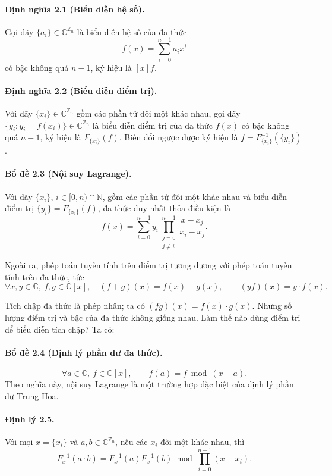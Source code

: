\documentclass[11pt]{article}
\begin{document}
\paragraph{Định nghĩa 2.1 (Biểu diễn hệ số).}
Gọi dãy \(\{a_i\}\in\mathbb C^{\mathbb Z_n}\) là biểu diễn hệ số của đa thức
\[
  f(x)=\sum_{i=0}^{n-1} a_i x^i
\]
có bậc không quá \(n-1\), ký hiệu là \([x]f\).

\paragraph{Định nghĩa 2.2 (Biểu diễn điểm trị).}
Với dãy \(\{x_i\}\in\mathbb C^{\mathbb Z_n}\) gồm các phần tử đôi một khác
nhau, gọi dãy \(\{y_i:y_i=f(x_i)\}\in\mathbb C^{\mathbb Z_n}\) là biểu diễn
điểm trị của đa thức \(f(x)\) có bậc không quá \(n-1\), ký hiệu là
\(F_{\{x_i\}}(f)\). Biến đổi ngược được ký hiệu là
\(f=F^{-1}_{\{x_i\}}(\{y_i\})\).

\paragraph{Bổ đề 2.3 (Nội suy Lagrange).}
Với dãy \(\{x_i\}\), \(i\in[0,n)\cap\mathbb N\), gồm các phần tử đôi một khác
nhau và biểu diễn điểm trị \(\{y_i\}=F_{\{x_i\}}(f)\), đa thức duy nhất thỏa
điều kiện là
\[
  f(x)=\sum_{i=0}^{n-1} y_i
       \prod_{\substack{j=0\\j\ne i}}^{n-1}
       \frac{x-x_j}{x_i-x_j}.
\]

Ngoài ra, phép toán tuyến tính trên điểm trị tương đương với phép toán tuyến
tính trên đa thức, tức
\[
  \forall x,y\in\mathbb C,\ f,g\in\mathbb C[x],\quad
  (f+g)(x)=f(x)+g(x),\qquad (yf)(x)=y\cdot f(x).
\]

Tích chập đa thức là phép nhân; ta có \((fg)(x)=f(x)\cdot g(x)\). Nhưng số lượng
điểm trị và bậc của đa thức không giống nhau. Làm thế nào dùng điểm trị để biểu
diễn tích chập? Ta có:

\paragraph{Bổ đề 2.4 (Định lý phần dư đa thức).}
\[
  \forall a\in\mathbb C,\ f\in\mathbb C[x],\qquad
  f(a)=f\bmod (x-a).
\]
Theo nghĩa này, nội suy Lagrange là một trường hợp đặc biệt của định lý phần dư
Trung Hoa.

\paragraph{Định lý 2.5.}
Với mọi \(x=\{x_i\}\) và \(a,b\in\mathbb C^{\mathbb Z_n}\), nếu các \(x_i\) đôi
một khác nhau, thì
\[
  F_x^{-1}(a\cdot b)
  =
  F_x^{-1}(a)F_x^{-1}(b)
  \bmod \prod_{i=0}^{n-1}(x-x_i).
\]
\end{document}
